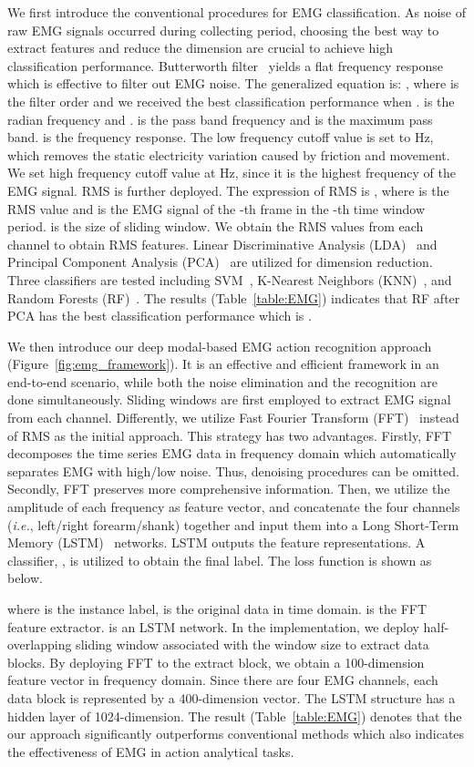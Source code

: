 \documentclass[a4paper, 10pt, conference]{ieeeconf}      \usepackage{FG2020}
\newcommand*\ie{\textit{i.e.}}
\begin{document}
We first introduce the conventional procedures for EMG classification. As noise of raw EMG signals occurred during collecting period, choosing the best way to extract features and reduce the dimension are crucial to achieve high classification performance. Butterworth filter~\cite{Butterworth} yields a flat frequency response which is effective to filter out EMG noise. The generalized equation is: , where  is the filter order and we received the best classification performance when .  is the radian frequency and .  is the pass band frequency and  is the maximum pass band.  is the frequency response. The low frequency cutoff value is set to  Hz, which removes the static electricity variation caused by friction and movement. We set high frequency cutoff value at  Hz, since it is the highest frequency of the EMG signal. RMS is further deployed. The expression of RMS is , where  is the RMS value and  is the EMG signal of the -th frame in the -th time window period.  is the size of sliding window. We obtain the RMS values from each channel to obtain RMS features. Linear Discriminative Analysis (LDA)~\cite{LDA} and Principal Component Analysis (PCA)~\cite{PCA} are utilized for dimension reduction. Three classifiers are tested including SVM~\cite{SVM}, K-Nearest Neighbors (KNN)~\cite{KNN}, and Random Forests (RF)~\cite{RandomForest}. The results (Table~\ref{table:EMG}) indicates that RF after PCA has the best classification performance which is .

We then introduce our deep modal-based EMG action recognition approach (Figure~\ref{fig:emg_framework}). It is an effective and efficient framework in an end-to-end scenario, while both the noise elimination and the recognition are done simultaneously. Sliding windows are first employed to extract EMG signal from each channel. Differently, we utilize Fast Fourier Transform (FFT)~\cite{FFT} instead of RMS as the initial approach. This strategy has two advantages. Firstly, FFT decomposes the time series EMG data in frequency domain which automatically separates EMG with high/low noise. Thus, denoising procedures can be omitted. Secondly, FFT preserves more comprehensive information. Then, we utilize the amplitude of each frequency as feature vector, and concatenate the four channels (\ie, left/right forearm/shank) together and input them into a Long Short-Term Memory (LSTM)~\cite{LSTM} networks. LSTM outputs the feature representations. A classifier, , is utilized to obtain the final label. The loss function is shown as below.

where  is the instance label,  is the original data in time domain.  is the FFT feature extractor.  is an LSTM network. In the implementation, we deploy half-overlapping sliding window associated with the window size  to extract data blocks. By deploying FFT to the extract block, we obtain a 100-dimension feature vector in frequency domain. Since there are four EMG channels, each data block is represented by a 400-dimension vector. The LSTM structure has a hidden layer of 1024-dimension. The result (Table~\ref{table:EMG}) denotes that the our approach significantly outperforms conventional methods which also indicates the effectiveness of EMG in action analytical tasks.
\end{document}
